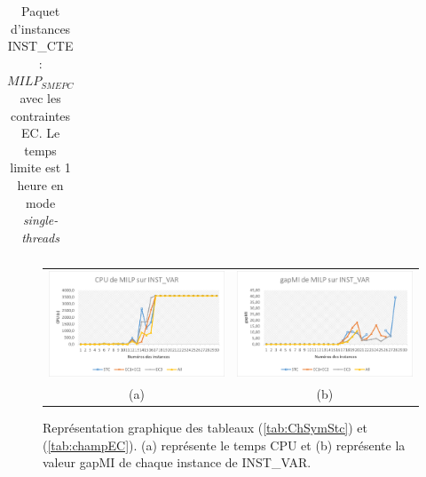 {\begin{table}[H]
\begin{tabular}{|r|rrrr|rrrr|rrrr|}
		
		\bottomrule
\end{tabular}%
\caption[Résultats de $MILP_{SMEPC}$ enrichi de EC sur INST\_CTE. Le temps limite est 1 heure en mode \textit{single-threads}]{Paquet d'instances INST\_CTE : $MILP_{SMEPC}$ avec les contraintes EC. Le temps limite est 1 heure en mode \textit{single-threads}}

\label{tab:champEC1}%
\end{table}%

\begin{figure}[H]
	\centering
	\begin{tabular}{c c}
		\includegraphics[width=9cm]{images_these/CPU_MILP_INST_VAR.pdf}&
		\includegraphics[width=9cm]{images_these/gapMI_MILP_INST_VAR.pdf}
		\\
		(a) & (b)
	\end{tabular}
	\caption[Représentation graphique du CPU et du gap des tableaux (\ref{tab:ChSymStc}) et (\ref{tab:champEC})]{Représentation graphique des tableaux (\ref{tab:ChSymStc}) et (\ref{tab:champEC}). (a) représente le temps CPU et (b) représente la valeur gapMI de chaque instance de INST\_VAR.}\label{gapMI_cpu_RMILP_INST_VAR}
\end{figure}

}
